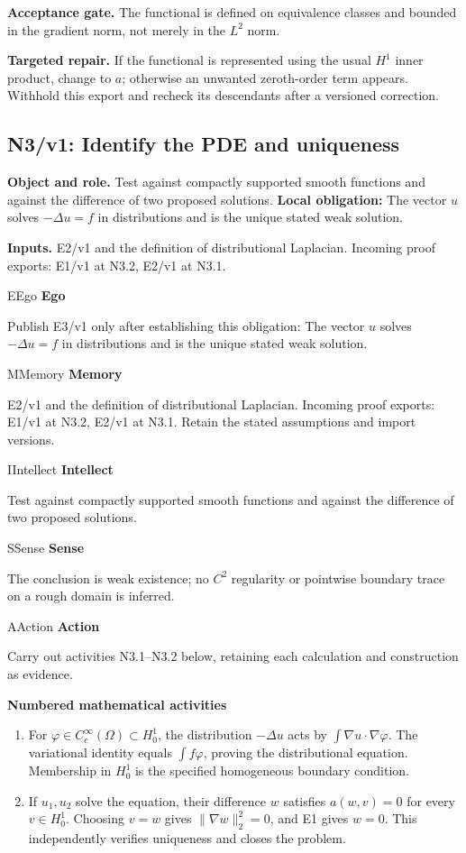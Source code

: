 \documentclass[preprint,12pt,aps,pra,showkeys,amsmath,amssymb,superscriptaddress,floatfix]{revtex4-2}
\theoremstyle{definition}
\theoremstyle{remark}
\newcommand{\mmfaculty}[3]{%
 \begin{mmfacultybox}{#1}{#2}
 {\sffamily\bfseries\color{MMBlue}#2}\par\smallskip #3
 \end{mmfacultybox}}
\newcommand{\field}[2]{\par\smallskip\noindent\textbf{#1.} #2\par}
\begin{document}
\field{Acceptance gate}{The functional is defined on equivalence classes and bounded in the
gradient norm, not merely in the \(L^2\) norm.}

\field{Targeted repair}{If the functional is represented using the usual \(H^1\) inner product,
change to \(a\); otherwise an unwanted zeroth-order term appears.
Withhold this export and recheck its descendants after a versioned
correction.}

\clearpage

\subsection{N3/v1: Identify the PDE and uniqueness}

\field{Object and role}{Test against compactly supported smooth functions and against the
difference of two proposed solutions. \textbf{Local obligation:} The
vector \(u\) solves \(-\Delta u=f\) in distributions and is the unique
stated weak solution.}

\field{Inputs}{E2/v1 and the definition of distributional Laplacian. Incoming proof
exports: E1/v1 at N3.2, E2/v1 at N3.1.}

\mmfaculty{E}{Ego}{Publish E3/v1 only after establishing this obligation: The vector \(u\)
solves \(-\Delta u=f\) in distributions and is the unique stated weak
solution.}

\mmfaculty{M}{Memory}{E2/v1 and the definition of distributional Laplacian. Incoming proof
exports: E1/v1 at N3.2, E2/v1 at N3.1. Retain the stated assumptions and
import versions.}

\mmfaculty{I}{Intellect}{Test against compactly supported smooth functions and against the
difference of two proposed solutions.}

\mmfaculty{S}{Sense}{The conclusion is weak existence; no \(C^2\) regularity or pointwise
boundary trace on a rough domain is inferred.}

\mmfaculty{A}{Action}{Carry out activities N3.1--N3.2 below, retaining each calculation and
construction as evidence.}

\smallskip\noindent\textbf{Numbered mathematical activities}

\begin{enumerate}[label=N3.\arabic*,leftmargin=3.4em]

\item For \(\varphi\in C_c^\infty(\Omega)\subset H_0^1\), the distribution
\(-\Delta u\) acts by \(\int\nabla u\cdot\nabla\varphi\). The
variational identity equals \(\int f\varphi\), proving the
distributional equation. Membership in \(H_0^1\) is the specified
homogeneous boundary condition.

\item If \(u_1,u_2\) solve the equation, their difference \(w\) satisfies
\(a(w,v)=0\) for every \(v\in H_0^1\). Choosing \(v=w\) gives
\(\|\nabla w\|_2^2=0\), and E1 gives \(w=0\). This independently
verifies uniqueness and closes the problem.

\end{enumerate}
\end{document}
